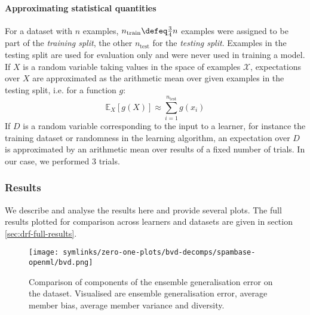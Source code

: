 \documentclass[../main.tex]{subfiles}
\begin{document}
\paragraph{Approximating statistical quantities} 
For a dataset with $n$ examples, $n_{\text{train}} \defeq \frac{3}{4}n$ examples were assigned to be part of the \textit{training split}, the other $n_{\text{test}}$ for the \textit{testing split}. Examples in the testing split are used for evaluation only and were never used in training a model.
If $X$ is a random variable taking values in the space of examples $\mathcal{X}$, expectations over $X$ are approximated as the arithmetic mean over given examples in the testing split, i.e. for a function $g$:
$$
\mathbb{E}_X \left[ g(X) \right]  \approx \sum_{i=1}^{n_\text{test}} g(x_i)
$$
If $D$ is a random variable corresponding to the input to a learner, for instance the training dataset or randomness in the learning algorithm, an expectation over $D$ is approximated by an arithmetic mean over results of a fixed number of trials. In our case, we performed $3$ trials. %

\subsubsection{Results}


We describe and analyse the results here and provide several plots. The full results plotted for comparison across learners and datasets are given in section \ref{sec:drf-full-results}.

\begin{figure*}
    \texttt{[image: symlinks/zero-one-plots/bvd-decomps/spambase-openml/bvd.png]}
    \caption{
        Comparison of components of the ensemble generalisation error on the \spambase dataset. Visualised are ensemble generalisation error, average member bias, average member variance and diversity.
    }
    \label{fig:spambase-bvd}
\end{figure*}



\end{document}
